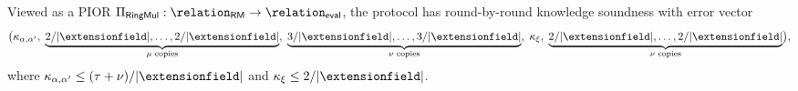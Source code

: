 
\begin{theorem}
\label{thm:rbr}
Viewed as a PIOR $\Pi_{\mathsf{RingMul}}: \relation_{\mathsf{RM}} \to \relation_{\mathsf{eval}}$, the protocol has round-by-round knowledge soundness with error vector
\[
\bigl(
\kappa_{\alpha,\alpha'},\;
\underbrace{2/|\extensionfield|,\dotsc,2/|\extensionfield|}_{\mu\text{ copies}},\;
\underbrace{3/|\extensionfield|,\dotsc,3/|\extensionfield|}_{\nu\text{ copies}},\;
\kappa_{\xi},\;
\underbrace{2/|\extensionfield|,\dotsc,2/|\extensionfield|}_{\nu\text{ copies}}
\bigr),
\]
where $\kappa_{\alpha,\alpha'} \le (\tau+\nu)/|\extensionfield|$ and $\kappa_{\xi}\le 2/|\extensionfield|$.
\end{theorem}


